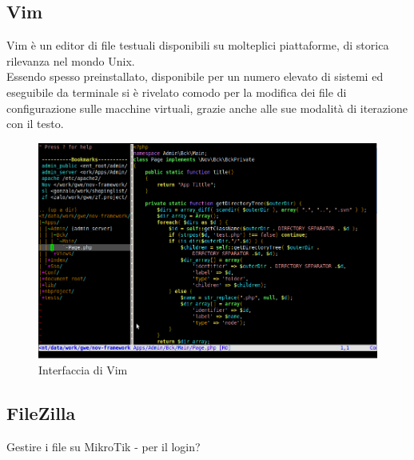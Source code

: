 \documentclass[Tesi.tex]{subfiles}
\begin{document}
\subsection{Vim}
Vim è un editor di file testuali disponibili su molteplici piattaforme, di storica rilevanza nel mondo Unix. \\
Essendo spesso preinstallato, disponibile per un numero elevato di sistemi ed eseguibile da terminale si è rivelato comodo per la modifica dei file di configurazione sulle macchine virtuali, grazie anche alle sue modalità di iterazione con il testo.
\begin{figure}[H]
	\centering
	\includegraphics[width=0.75\linewidth]{"images/vim"}
	\caption{Interfaccia di Vim}
	\label{fig:Interfaccia di Vim}
\end{figure}


\subsection{FileZilla}
Gestire i file su MikroTik - per il login?
\end{document}
